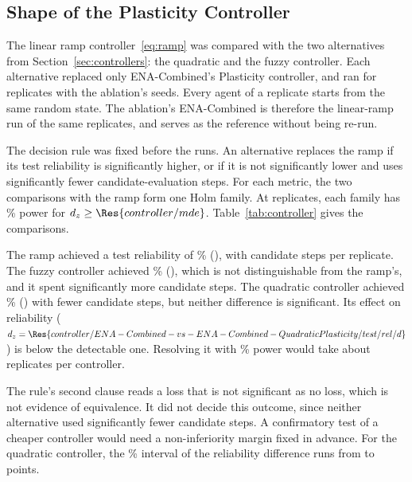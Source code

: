 \subsection{Shape of the Plasticity Controller}
\label{sec:controller}
The linear ramp controller~\eqref{eq:ramp} was compared with the two alternatives from Section~\ref{sec:controllers}: the quadratic and the fuzzy controller. Each alternative replaced only ENA-Combined's Plasticity controller, and ran for  replicates with the ablation's seeds. Every agent of a replicate starts from the same random state. The ablation's ENA-Combined is therefore the linear-ramp run of the same replicates, and serves as the reference without being re-run.

The decision rule was fixed before the runs. An alternative replaces the ramp if its test reliability is significantly higher, or if it is not significantly lower and uses significantly fewer candidate-evaluation steps. For each metric, the two comparisons with the ramp form one Holm family. At  replicates, each family has \% power for $d_z \ge \Res{controller/mde}$. Table~\ref{tab:controller} gives the comparisons.

The ramp achieved a test reliability of \% (), with  candidate steps per replicate. The fuzzy controller achieved \% (), which is not distinguishable from the ramp's, and it spent significantly more candidate steps. The quadratic controller achieved \% () with fewer candidate steps, but neither difference is significant. Its effect on reliability ($d_z = \Res{controller/ENA-Combined-vs-ENA-Combined-QuadraticPlasticity/test/rel/d}$) is below the detectable one. Resolving it with \% power would take about  replicates per controller.

The rule's second clause reads a loss that is not significant as no loss, which is not evidence of equivalence. It did not decide this outcome, since neither alternative used significantly fewer candidate steps. A confirmatory test of a cheaper controller would need a non-inferiority margin fixed in advance. For the quadratic controller, the \% interval of the reliability difference runs from  to  points.

